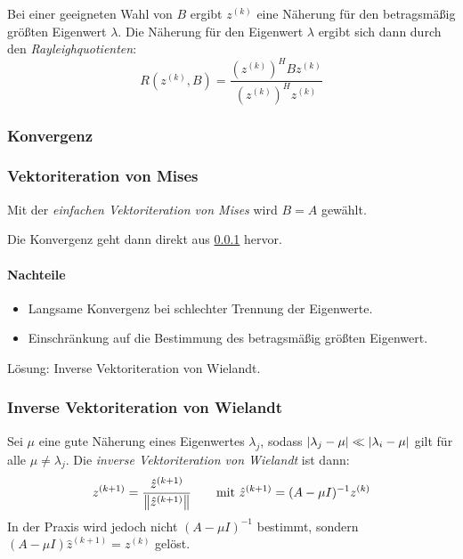 				Bei einer geeigneten Wahl von \(B\) ergibt \(z^{(k)}\) eine Näherung für den betragsmäßig größten Eigenwert \(\lambda\). Die Näherung für den Eigenwert \(\lambda\) ergibt sich dann durch den \textit{Rayleighquotienten}:
				\begin{equation*}
					R(z^{(k)}, B) = \frac{(z^{(k)})^H B z^{(k)}}{(z^{(k)})^H z^{(k)}}
				\end{equation*}

				\subsubsection{Konvergenz}
					\label{sec:eqconvergence}


				\subsubsection{Vektoriteration von Mises}
					Mit der \textit{einfachen Vektoriteration von Mises} wird \( B = A \) gewählt.

					Die Konvergenz geht dann direkt aus \ref{sec:eqconvergence} hervor.

					\paragraph{Nachteile}
						\begin{itemize}
							\item Langsame Konvergenz bei schlechter Trennung der Eigenwerte.
							\item Einschränkung auf die Bestimmung des betragsmäßig größten Eigenwert.
						\end{itemize}
						Lösung: Inverse Vektoriteration von Wielandt.

				\subsubsection{Inverse Vektoriteration von Wielandt}
					Sei \( \mu \) eine gute Näherung eines Eigenwertes \( \lambda_j \), sodass \( \abs{\lambda_j - \mu} \ll \abs{\lambda_i - \mu} \) gilt für alle \( \mu \neq \lambda_j \). Die \textit{inverse Vektoriteration von Wielandt} ist dann:
					\begin{equation*}
						z^{(k+1)} = \frac{\hat{z}^{(k+1)}}{\norm{\hat{z}^{(k+1)}}} \qquad \textrm{mit } \hat{z}^{(k+1)} = (A - \mu I)^{-1} z^{(k)}
					\end{equation*}
					In der Praxis wird jedoch nicht \( (A - \mu I)^{-1} \) bestimmt, sondern \( (A - \mu I) \hat{z}^{(k+1)} = z^{(k)} \) gelöst.

